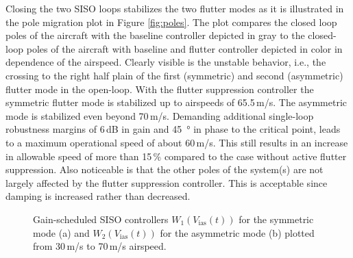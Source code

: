 \documentclass[aerospace,article,submit,moreauthors,pdftex,10pt,a4paper]{Definitions/mdpi}
\begin{document}
Closing the two SISO loops stabilizes the two flutter modes as it is illustrated in the pole migration plot in Figure  \ref{fig:poles}. The plot compares the closed loop poles of the aircraft with the baseline controller depicted in gray to the closed-loop poles of the aircraft with baseline and flutter controller depicted in color in dependence of the airspeed. Clearly visible is the unstable behavior, i.e., the crossing to the right half plain of the first (symmetric) and second (asymmetric) flutter mode in the open-loop. With the flutter suppression controller the symmetric flutter mode is stabilized up to airspeeds of 65.5\,m/s. The asymmetric mode is stabilized even beyond  70\,m/s. Demanding additional single-loop robustness margins of 6\,dB in gain and \SI{45}{\degree} in phase to the critical point, leads to a maximum operational speed of about 60\,m/s. This still results in an increase in allowable speed of more than 15\,\% compared to the case without active flutter suppression. Also noticeable is that the other poles of the system(s) are not largely affected by the flutter suppression controller. This is acceptable since damping is increased rather than decreased.

%


\begin{figure}[h]
	\centering
	
	\caption{Gain-scheduled \ac{SISO} controllers $W_{1}(V_{\text{ias}}(t))$ for the symmetric mode (a) and $W_{2}(V_{\text{ias}}(t))$ for the asymmetric mode (b) plotted from 30\,m/s to 70\,m/s airspeed.}
	\label{fig:sisoC}	
\end{figure}





\end{document}
